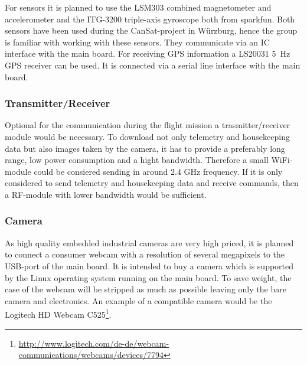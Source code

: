 \documentclass[fontsize=11pt,paper=a4,]{scrartcl}
\begin{document}
For sensors it is planned to use the LSM303 \cite{LSM303:datasheet} combined magnetometer and accelerometer and the ITG-3200 triple-axis gyroscope \cite{ITG-3200:datasheet} both from sparkfun. Both sensors have been used during the CanSat-project in Würzburg, hence the group is familiar with working with these sensors. They communicate via an I{\texttwosuperior}C interface with the main board. For receiving GPS information a LS20031 5~Hz GPS receiver \cite{LS20031:datasheet} can be used. It is connected via a serial line interface with the main board.


\subsubsection*{Transmitter/Receiver}

{\color{red} Optional for the communication during the flight mission a trasmitter/receiver module would be necessary. To download not only telemetry and housekeeping data but also images taken by the camera, it has to provide a preferably long range, low power consumption and a hight bandwidth. Therefore a small WiFi-module could be consiered sending in around 2.4 GHz frequency. If it is only considered to send telemetry and housekeeping data and receive commands, then a RF-module with lower bandwidth would be sufficient.}



\subsubsection*{Camera}

As high quality embedded industrial cameras are very high priced, it is planned to connect a consumer webcam with a resolution of several megapixels to the USB-port of the main board. It is intended to buy a camera which is supported by the Linux operating system running on the main board. To save weight, the case of the webcam will be stripped as much as possible leaving only the bare camera and electronics. An example of a compatible camera would be the Logitech HD Webcam C525\footnote{\url{http://www.logitech.com/de-de/webcam-communications/webcams/devices/7794}}.


\FloatBarrier
\end{document}
